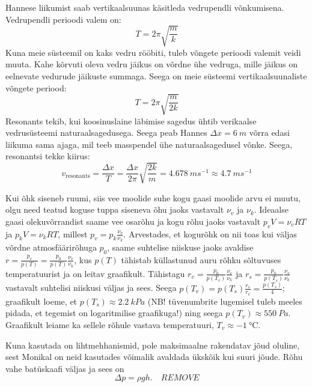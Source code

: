 \documentclass[10pt]{article}
\newcommand{\pp}[1]{REMOVE}
\begin{document}
\setAuthor{}

\solu
Hannese liikumist saab vertikaalsuunas käsitleda vedrupendli võnkumisena. Vedrupendli perioodi valem on: $$T=2\pi \sqrt{\frac{m}{k}}$$ Kuna meie süsteemil on kaks vedru rööbiti, tuleb võngete perioodi valemit veidi muuta. Kahe kõrvuti oleva vedru jäikus on võrdne ühe vedruga, mille jäikus on eelnevate vedurude jäikuste summaga. Seega on meie süsteemi vertikaalsuunaliste võngete periood:
$$T = 2\pi \sqrt{\frac{m}{2k}}$$
Resonants tekib, kui koosinuslaine läbimise sagedus ühtib verikaalse vedrusüsteemi naturaalsagedusega. Seega peab Hannes $\Delta x = \SI{6}{m}$ võrra edasi liikuma sama ajaga, mil teeb masspendel ühe naturaalsagedusel võnke. Seega, resonantsi tekke kiirus:
$$v_\mathrm{resonants}=\frac{\Delta x}{T}=\frac{\Delta x}{2 \pi} \sqrt{\frac{2k}{m}} = \SI{4.678}{m s^{-1}} \approx \SI{4.7}{m s^{-1}}$$
\probend
\bigskip


\solu
Kui õhk siseneb ruumi, siis vee moolide suhe kogu gaasi moolide arvu ei muutu, olgu need teatud koguse tuppa siseneva õhu jaoks vastavalt $\nu_v$ ja $\nu_k$. Ideaalse gaasi olekuvõrrandist saame vee osarõhu ja kogu rõhu jaoks vastavalt $p_vV=\nu_vRT$ ja $p_kV=\nu_kRT$, millest $p_v = p_k\frac{\nu_v}{\nu_k}$. Arvestades, et kogurõhk on nii toas kui väljas võrdne atmosfäärirõhuga $p_0$, saame suhtelise niiskuse jaoks avaldise $r=\frac{p_v}{p(T)}=\frac{p_0}{p(T)}\frac{\nu_v}{\nu_k}$, kus $p(T)$ tähistab küllastunud auru rõhku sõltuvuses temperatuurist ja on leitav graafikult. Tähistagu $r_v=\frac{p_0}{p(T_v)}\frac{\nu_v}{\nu_k}$ ja $r_s=\frac{p_0}{p(T_s)}\frac{\nu_v}{\nu_k}$ vastavalt suhtelisi niiskusi väljas ja sees. Seega $p(T_v)=p(T_s)\frac{r_s}{r_v}=\frac{p(T_s)}{4}$; graafikult loeme, et $p(T_s)\approx \SI{2,2}{kPa}$ (NB! tüvenumbrite lugemisel tuleb meeles pidada, et tegemist on logaritmilise graafikuga!) ning seega $p(T_v)\approx\SI{550}{Pa}$. Graafikult leiame ka sellele rõhule vastava temperatuuri, $T_v \approx \SI{-1}\celsius$.
\probend
\bigskip


\solu
Kuna kasutada on lihtmehhanismid, pole maksimaalne rakendatav jõud oluline, sest Monikal on neid kasutades võimalik avaldada ükskõik kui suuri jõude. Rõhu vahe batüskaafi väljas ja sees on
$$\Delta p=\rho gh. \quad \pp{2}$$
\end{document}
